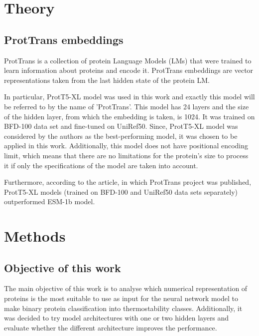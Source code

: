 \documentclass[12pt]{article}
\begin{document}
	\section{Theory}

	\subsection{ProtTrans embeddings}

	ProtTrans\cite{elnaggar2020prottrans} is a collection 
	of protein Language Models 
	(LMs) that were trained to learn information about 
	proteins and encode it. ProtTrans embeddings are vector 
	representations taken from the last hidden state of 
	the protein LM. 

	In particular, ProtT5-XL model was used in this work and 
	exactly this model will be referred to by the name of 
	'ProtTrans'. This model has 24 layers 
	and the size of the hidden layer, from which the 
	embedding is taken, is 1024. It was trained on 
	BFD-100 data set 
	and fine-tuned on UniRef50. Since, ProtT5-XL model was 
	considered by the 
	authors as the best-performing model, it was chosen to be 
	applied in this work. Additionally, this model 
	does not have 
	positional encoding limit, which means that there are 
	no limitations for the protein's size to process it 
	if only the specifications of the model are taken into 
	account. 

	Furthermore, according to the article, in which ProtTrans
	project was published, ProtT5-XL models (trained on BFD-100 
	and UniRef50 data sets separately) 
	outperformed ESM-1b\cite{rives2021biological} model.

	

	\newpage

	\section{Methods}

	\subsection{Objective of this work}

	The main objective of this work is to analyse 
	which numerical representation of proteins is the most 
	suitable to use as input for the neural network 
	model to make binary protein classification into thermostability
	classes. Additionally, it was decided to try model 
	architectures with one or two hidden layers and evaluate 
	whether the different architecture improves the 
	performance.
\end{document}
